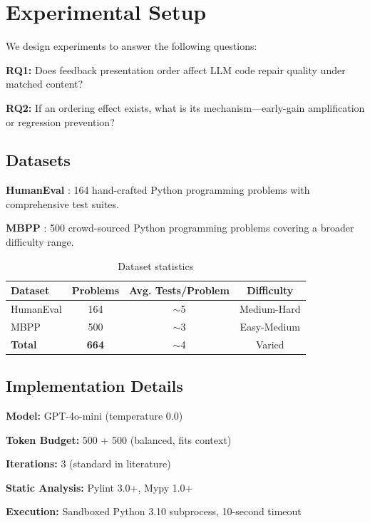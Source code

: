 \section{Experimental Setup}
\label{sec:experiments}

We design experiments to answer the following questions:

\textbf{RQ1:} Does feedback presentation order affect LLM code repair quality under matched content?

\textbf{RQ2:} If an ordering effect exists, what is its mechanism---early-gain amplification or regression prevention?

\subsection{Datasets}

\textbf{HumanEval} \citep{chen2021evaluating}: 164 hand-crafted Python programming problems with comprehensive test suites.

\textbf{MBPP} \citep{austin2021program}: 500 crowd-sourced Python programming problems covering a broader difficulty range.

\begin{table}[h]
\centering
\caption{Dataset statistics}
\label{tab:datasets}
\begin{tabular}{@{}lccc@{}}
\toprule
Dataset & Problems & Avg. Tests/Problem & Difficulty \\
\midrule
HumanEval & 164 & $\sim$5 & Medium-Hard \\
MBPP & 500 & $\sim$3 & Easy-Medium \\
\midrule
\textbf{Total} & \textbf{664} & $\sim$4 & Varied \\
\bottomrule
\end{tabular}
\end{table}

\subsection{Implementation Details}

\textbf{Model:} GPT-4o-mini (temperature 0.0)

\textbf{Token Budget:} 500 + 500 (balanced, fits context)

\textbf{Iterations:} 3 (standard in literature)

\textbf{Static Analysis:} Pylint 3.0+, Mypy 1.0+

\textbf{Execution:} Sandboxed Python 3.10 subprocess, 10-second timeout
